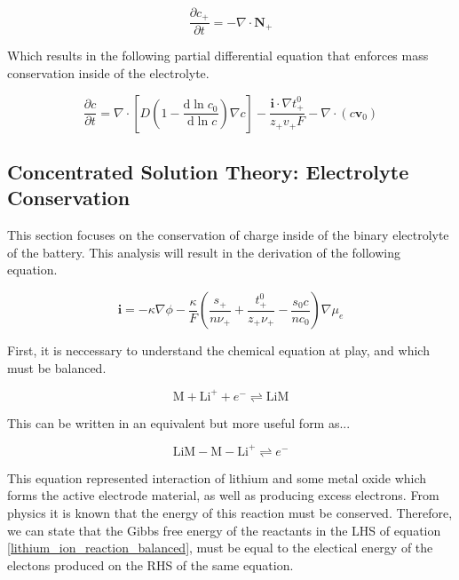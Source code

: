 \documentclass[lettersize,journal]{IEEEtran}
\begin{document}
\begin{equation}
\frac{\partial c_{+}}{\partial t}=-\nabla \cdot \mathbf{N}_{+}
\end{equation}



Which results in the following partial differential equation that enforces mass conservation inside of the electrolyte.



\begin{equation}
  \frac{\partial c}{\partial t}=\nabla \cdot\left[D\left(1-\frac{\mathrm{d} \ln c_{0}}{\mathrm{~d} \ln c}\right) \nabla c\right]-\frac{\mathbf{i} \cdot \nabla t_{+}^{0}}{z_{+} v_{+} F}-\nabla \cdot\left(c \mathbf{v}_{0}\right)
\end{equation}

\subsection{Concentrated Solution Theory: Electrolyte Conservation}

This section focuses on the conservation of charge inside of the binary electrolyte of the battery. This analysis will result in the derivation of the following equation.

\begin{equation}
\mathbf{i}=-\kappa \nabla \phi-\frac{\kappa}{F}\left(\frac{s_{+}}{n \nu_{+}}+\frac{t_{+}^{0}}{z_{+} \nu_{+}}-\frac{s_{0} c}{n c_{0}}\right) \nabla \mu_{e}
\end{equation}


First, it is neccessary to understand the chemical equation at play, and which must be balanced.

\begin{equation}
\mathrm{M}+\mathrm{Li}^{+}+e^{-} \rightleftharpoons \mathrm{LiM}
\end{equation}

This can be written in an equivalent but more useful form as...

\begin{equation}\label{lithium_ion_reaction_balanced}
\mathrm{LiM}-\mathrm{M}-\mathrm{Li}^{+} \rightleftharpoons e^{-}
\end{equation}

This equation represented interaction of lithium and some metal oxide which forms the active electrode material, as well as producing excess electrons. From physics it is known that the energy of this reaction must be conserved. Therefore, we can state that the Gibbs free energy of the reactants in the LHS of equation \ref{lithium_ion_reaction_balanced}, must be equal to the electical energy of the electons produced on the RHS of the same equation.
\end{document}
